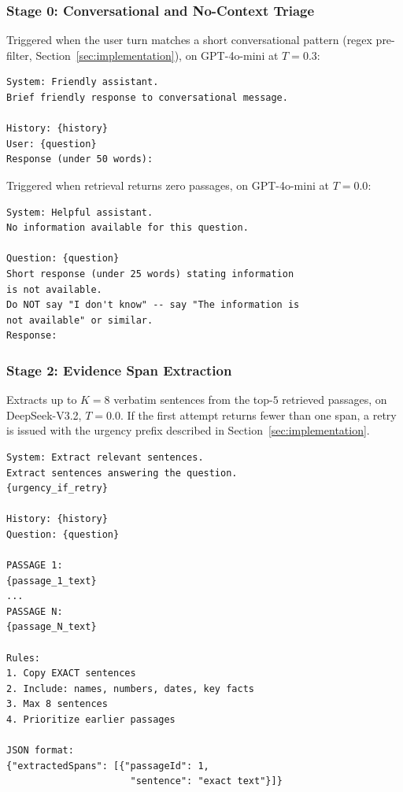 \subsubsection{Stage 0: Conversational and No-Context Triage}
Triggered when the user turn matches a short conversational pattern (regex pre-filter, Section~\ref{sec:implementation}), on GPT-4o-mini at $T{=}0.3$:
\begin{verbatim}
System: Friendly assistant.
Brief friendly response to conversational message.

History: {history}
User: {question}
Response (under 50 words):
\end{verbatim}
Triggered when retrieval returns zero passages, on GPT-4o-mini at $T{=}0.0$:
\begin{verbatim}
System: Helpful assistant.
No information available for this question.

Question: {question}
Short response (under 25 words) stating information 
is not available.
Do NOT say "I don't know" -- say "The information is 
not available" or similar.
Response:
\end{verbatim}

\subsubsection{Stage 2: Evidence Span Extraction}
Extracts up to $K{=}8$ verbatim sentences from the top-$5$ retrieved passages, on DeepSeek-V3.2, $T{=}0.0$. If the first attempt returns fewer than one span, a retry is issued with the urgency prefix described in Section~\ref{sec:implementation}.
\begin{verbatim}
System: Extract relevant sentences.
Extract sentences answering the question.
{urgency_if_retry}

History: {history}
Question: {question}

PASSAGE 1:
{passage_1_text}
...
PASSAGE N:
{passage_N_text}

Rules:
1. Copy EXACT sentences
2. Include: names, numbers, dates, key facts
3. Max 8 sentences
4. Prioritize earlier passages

JSON format:
{"extractedSpans": [{"passageId": 1, 
                      "sentence": "exact text"}]}
\end{verbatim}

